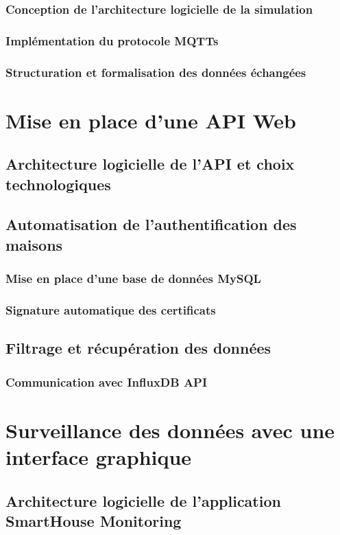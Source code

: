 \documentclass[10pt, a4paper]{report}
\begin{document}
	\subsubsection{Conception de l'architecture logicielle de la simulation}
	\subsubsection{Implémentation du protocole MQTTs}
	\subsubsection{Structuration et formalisation des données échangées}
	
	\section{Mise en place d'une API Web}
	\subsection{Architecture logicielle de l'API et choix technologiques}
	\subsection{Automatisation de l'authentification des maisons}
	\subsubsection{Mise en place d'une base de données MySQL}
	\subsubsection{Signature automatique des certificats}
	\subsection{Filtrage et récupération des données}
	\subsubsection{Communication avec InfluxDB API}
	
	\section{Surveillance des données avec une interface graphique}
	\subsection{Architecture logicielle de l'application SmartHouse Monitoring}
\end{document}
